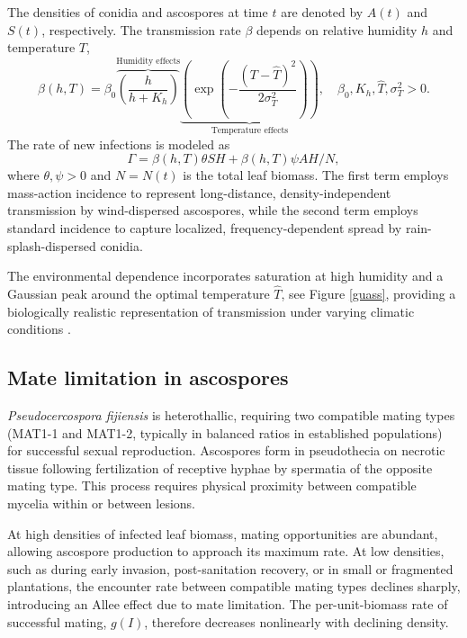 \documentclass[11pt]{article}
\numberwithin{equation}{section}
\begin{document}
The densities of conidia and ascospores at time $t$ are denoted by $A(t)$ and $S(t)$, respectively. The transmission rate $\beta$ depends on relative humidity $h$ and temperature $T$, 
\begin{equation}
    \beta(h,T)=\beta_0\overbrace{\left(\frac{h}{h+K_h}\right)}^{\text{Humidity effects}}\underbrace{\left(\exp{\left(-\frac{(T-\hat{T})^2}{2\sigma_T^2}\right)}\right)}_{\text{Temperature effects}}, \quad \beta_0,K_h,\hat{T},\sigma^2_T>0.
\end{equation}
The rate of new infections is modeled as 
\begin{equation}\label{FOI}
\Gamma=\beta(h, T)\theta SH + \beta(h,T)\psi A H/N,    
\end{equation}
where $\theta, \psi > 0$ and $N=N(t)$ is the total leaf biomass. The first term employs mass-action incidence to represent long-distance, density-independent transmission by wind-dispersed ascospores, while the second term employs standard incidence to capture localized, frequency-dependent spread by rain-splash-dispersed conidia. 

The environmental dependence incorporates saturation at high humidity and a Gaussian peak around the optimal temperature $\hat{T}$, see Figure \ref{guass}, providing a biologically realistic representation of transmission under varying climatic conditions \cite{bari,ramirez}.

\subsection{Mate limitation in ascospores}
\textit{Pseudocercospora fijiensis} is heterothallic, requiring two compatible mating types (MAT1-1 and MAT1-2, typically in balanced ratios in established populations) for successful sexual reproduction. Ascospores form in pseudothecia on necrotic tissue following fertilization of receptive hyphae by spermatia of the opposite mating type. This process requires physical proximity between compatible mycelia within or between lesions.

At high densities of infected leaf biomass, mating opportunities are abundant, allowing ascospore production to approach its maximum rate. At low densities, such as during early invasion, post-sanitation recovery, or in small or fragmented plantations, the encounter rate between compatible mating types declines sharply, introducing an Allee effect due to mate limitation. The per-unit-biomass rate of successful mating, $g(I)$, therefore decreases nonlinearly with declining density.
\end{document}
